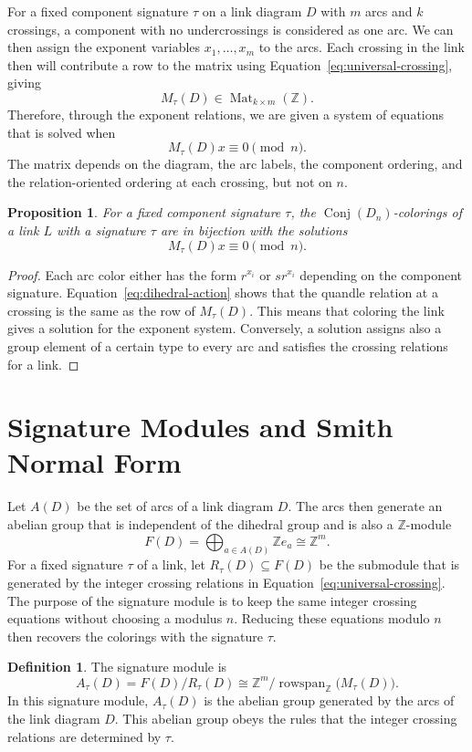 \documentclass[11pt]{article}
\newtheorem{proposition}[theorem]{Proposition}
\theoremstyle{definition}
\newtheorem{definition}[theorem]{Definition}
\newcommand{\Z}{\mathbb{Z}}
\newcommand{\Conj}{\operatorname{Conj}}
\newcommand{\rowspan}{\operatorname{rowspan}}
\begin{document}
For a fixed component signature $\tau$ on a link diagram $D$ with $m$ arcs and $k$ crossings, a component with no undercrossings is considered as one arc. We can then assign the exponent variables $x_1,\ldots,x_m$ to the arcs. Each crossing in the link then will contribute a row to the matrix using Equation~\eqref{eq:universal-crossing}, giving
\[
M_\tau(D)\in\operatorname{Mat}_{k\times m}(\Z).
\]
Therefore, through the exponent relations, we are given a system of equations that is solved when
\[
M_\tau(D)x\equiv0\pmod n.
\]
The matrix depends on the diagram, the arc labels, the component ordering, and the relation-oriented ordering at each crossing, but not on $n$.

\begin{proposition}
For a fixed component signature $\tau$, the $\Conj(D_n)$-colorings of a link $L$ with a signature $\tau$ are in bijection with the solutions
\[
M_\tau(D)x\equiv0\pmod n.
\]
\end{proposition}

\begin{proof}
Each arc color either has the form $r^{x_i}$ or $sr^{x_i}$ depending on the component signature. Equation~\eqref{eq:dihedral-action} shows that the quandle relation at a crossing is the same as the row of $M_\tau(D)$. This means that coloring the link gives a solution for the exponent system. Conversely, a solution assigns also a group element of a certain type to every arc and satisfies the crossing relations for a link.
\end{proof}

\section{Signature Modules and Smith Normal Form}

Let $A(D)$ be the set of arcs of a link diagram $D$. The arcs then generate an abelian group that is independent of the dihedral group and is also a $\Z$-module
\[
F(D)=\bigoplus_{a\in A(D)}\Z e_a\cong\Z^m.
\]
For a fixed signature $\tau$ of a link, let $R_\tau(D)\subseteq F(D)$ be the submodule that is generated by the integer crossing relations in Equation~\eqref{eq:universal-crossing}.  The purpose of the signature module is to keep the same integer crossing equations without choosing a modulus \(n\). Reducing these equations modulo \(n\) then recovers the colorings with the signature \(\tau\).

\begin{definition}
The signature module is
\begin{equation}
A_\tau(D)=F(D)/R_\tau(D)
\cong
\Z^m/\rowspan_{\Z}\bigl(M_\tau(D)\bigr).
\label{eq:signature-module}
\end{equation}
In this signature module, $A_\tau(D)$ is the abelian group generated by the arcs of the link diagram $D$. This abelian group obeys the rules that the integer crossing relations are determined by $\tau$.
\end{definition}
\end{document}
